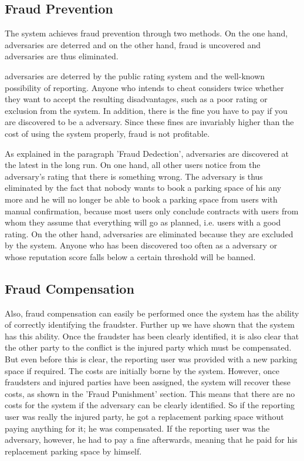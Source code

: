 \documentclass[
a4paper,     %
titlepage,   %
14pt         %
]{scrartcl}  %
\theoremstyle{mystyle}
\begin{document}
\subsection{Fraud Prevention}
The system achieves fraud prevention through two methods. On the one hand, adversaries are deterred and on the other hand, fraud is uncovered and adversaries are thus eliminated.

adversaries are deterred by the public rating system and the well-known possibility of reporting. Anyone who intends to cheat considers twice whether they want to accept the resulting disadvantages, such as a poor rating or exclusion from the system. In addition, there is the fine you have to pay if you are discovered to be a adversary. Since these fines are invariably higher than the cost of using the system properly, fraud is not profitable.

As explained in the paragraph 'Fraud Dedection', adversaries are discovered at the latest in the long run. On one hand, all other users notice from the adversary's rating that there is something wrong. The adversary is thus eliminated by the fact that nobody wants to book a parking space of his any more and he will no longer be able to book a parking space from users with manual confirmation, because most users only conclude contracts with users from whom they assume that everything will go as planned, i.e. users with a good rating. On the other hand, adversaries are eliminated because they are excluded by the system. Anyone who has been discovered too often as a adversary or whose reputation score falls below a certain threshold will be banned.

\subsection{Fraud Compensation}
Also, fraud compensation can easily be performed once the system has the ability of correctly identifying the fraudster. Further up we have shown that the system has this ability. Once the fraudster has been clearly identified, it is also clear that the other party to the conflict is the injured party which must be compensated. \\

But even before this is clear, the reporting user was provided with a new parking space if required. The costs are initially borne by the system. However, once fraudsters and injured parties have been assigned, the system will recover these costs, as shown in the 'Fraud Punishment' section. This means that there are no costs for the system if the adversary can be clearly identified. So if the reporting user was really the injured party, he got a replacement parking space without paying anything for it; he was compensated. If the reporting user was the adversary, however, he had to pay a fine afterwards, meaning that he paid for his replacement parking space by himself.
\end{document}
